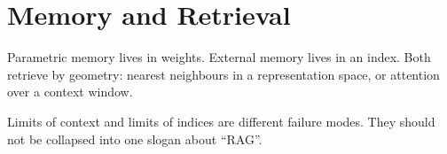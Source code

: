 \chapter{Memory and Retrieval}
\label{ch:memory}

Parametric memory lives in weights. External memory lives in an index. Both retrieve by geometry: nearest neighbours in a representation space, or attention over a context window.

Limits of context and limits of indices are different failure modes. They should not be collapsed into one slogan about ``RAG''.
